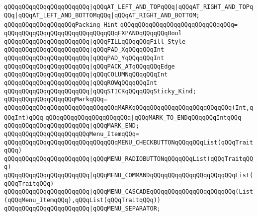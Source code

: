 \verb|qQQqqQQqqQQqqQQqqQQqqQQq|\verb#|qQQqAT_LEFT_AND_TOPqQQq|qQQqAT_RIGHT_AND_TOPqQQq|qQQqAT_LEFT_AND_BOTTOMqQQq|qQQqAT_RIGHT_AND_BOTTOM;#\newline
\newline
\verb|qQQqqQQqqQQqqQQqqQQqPacking_Hint|\newline
\verb|qQQqqQQqqQQqqQQqqQQqqQQqqQQqqQQq=|\newline
\verb|qQQqqQQqqQQqqQQqqQQqqQQqqQQqqQQqEXPANDqQQqqQQqBool|\newline
\verb|qQQqqQQqqQQqqQQqqQQqqQQq|\verb#|qQQqFILLqQQqqQQqFill_Style#\newline
\verb|qQQqqQQqqQQqqQQqqQQqqQQq|\verb#|qQQqPAD_XqQQqqQQqInt#\newline
\verb|qQQqqQQqqQQqqQQqqQQqqQQq|\verb#|qQQqPAD_YqQQqqQQqInt#\newline
\verb|qQQqqQQqqQQqqQQqqQQqqQQq|\verb#|qQQqPACK_ATqQQqqQQqEdge#\newline
\verb|qQQqqQQqqQQqqQQqqQQqqQQq|\verb#|qQQqCOLUMNqQQqqQQqInt#\newline
\verb|qQQqqQQqqQQqqQQqqQQqqQQq|\verb#|qQQqROWqQQqqQQqInt#\newline
\verb|qQQqqQQqqQQqqQQqqQQqqQQq|\verb#|qQQqSTICKqQQqqQQqSticky_Kind;#\newline
\newline
\verb|qQQqqQQqqQQqqQQqqQQqMarkqQQq=|\newline
\verb|qQQqqQQqqQQqqQQqqQQqqQQqqQQqqQQqMARKqQQqqQQqqQQqqQQqqQQqqQQqqQQq(Int,qQQqInt)qQQq|\newline
\verb|qQQqqQQqqQQqqQQqqQQqqQQq|\verb#|qQQqMARK_TO_ENDqQQqqQQqIntqQQq#\newline
\verb|qQQqqQQqqQQqqQQqqQQqqQQq|\verb#|qQQqMARK_END;#\newline
\newline
\verb|qQQqqQQqqQQqqQQqqQQqqQQqMenu_ItemqQQq=|\newline
\verb|qQQqqQQqqQQqqQQqqQQqqQQqqQQqqQQqMENU_CHECKBUTTONqQQqqQQqList(qQQqTraitqQQq)|\newline
\verb|qQQqqQQqqQQqqQQqqQQqqQQq|\verb#|qQQqMENU_RADIOBUTTONqQQqqQQqList(qQQqTraitqQQq)#\newline
\verb|qQQqqQQqqQQqqQQqqQQqqQQq|\verb#|qQQqMENU_COMMANDqQQqqQQqqQQqqQQqqQQqqQQqList(qQQqTraitqQQq)#\newline
\verb|qQQqqQQqqQQqqQQqqQQqqQQq|\verb#|qQQqMENU_CASCADEqQQqqQQqqQQqqQQqqQQqqQQq(List(qQQqMenu_ItemqQQq),qQQqList(qQQqTraitqQQq))#\newline
\verb|qQQqqQQqqQQqqQQqqQQqqQQq|\verb#|qQQqMENU_SEPARATOR;#\newline
